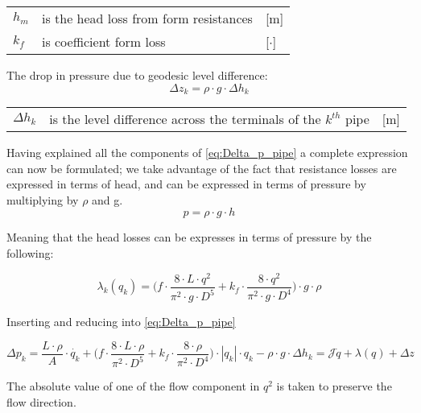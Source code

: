 \begin{center}
	\begin{tabular}{l p{8cm} l}
		$h_{m}$ & is the head loss from form resistances & [\si{m}]\\
		$k_{f}$ &  is coefficient form loss & [$\cdot$]\\
	\end{tabular}
\end{center}

The drop in pressure due to geodesic level difference:
\begin{equation}
	\Delta{z_{k}} = \rho \cdot g \cdot \Delta{h_{k}}
\end{equation}

\begin{center}
	\begin{tabular}{l p{8cm} l}
		$\Delta{h_{k}}$ &  is the level difference across the terminals of the $k^{th}$ pipe & [\si{m}]\\
	\end{tabular}
\end{center}

Having explained all the components of \eqref{eq:Delta_p_pipe} a complete expression can now be formulated; we take advantage of the fact that resistance losses are expressed in terms of head, and can be expressed in terms of pressure by multiplying by $\rho$ and g. \begin{equation}
	p = \rho \cdot g \cdot h  
\end{equation}

Meaning that the head losses can be expresses in terms of pressure by the following:

\begin{equation}
\lambda_{k}(q_{k})  =	\Big(f \cdot \frac{8\cdot L\cdot q^{2}}{\pi^{2}\cdot g \cdot D^{5}} + k_{f}\cdot \frac{8\cdot q^{2}}{\pi^{2}\cdot g \cdot D^{4}}\Big)\cdot g \cdot \rho
\end{equation}

Inserting and reducing into \cref{eq:Delta_p_pipe}

\begin{equation}
	\Delta{p_{k}} = \frac{L\cdot \rho}{A}\cdot \dot{q_{k}}
	+\Big(f \cdot \frac{8\cdot L\cdot \rho}{\pi^{2} \cdot D^{5}} + k_{f}\cdot \frac{8\cdot \rho}{\pi^{2} \cdot D^{4}}\Big)\cdot |q_{k}|\cdot q_{k} 
	- \rho \cdot g \cdot \Delta{h_{k}} = \mathcal{J}\dot{q} + \lambda(q) + \Delta z
\end{equation}

The absolute value of one of the flow component in $q^{2}$ is taken to preserve the flow direction.


